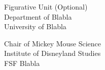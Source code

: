 \thispagestyle{empty}
\null\vfill


\begin{minipage}[t]{0.48\textwidth}
Figurative Unit (Optional)\\
Department of Blabla\\
University of Blabla
\end{minipage}
\hfill
\begin{minipage}[t]{0.48\textwidth}
\begin{flushright}
Chair of Mickey Mouse Science\\
Institute of Disneyland Studies\\
FSF Blabla
\end{flushright}
\end{minipage}

\vfill\vfill

\clearpage







